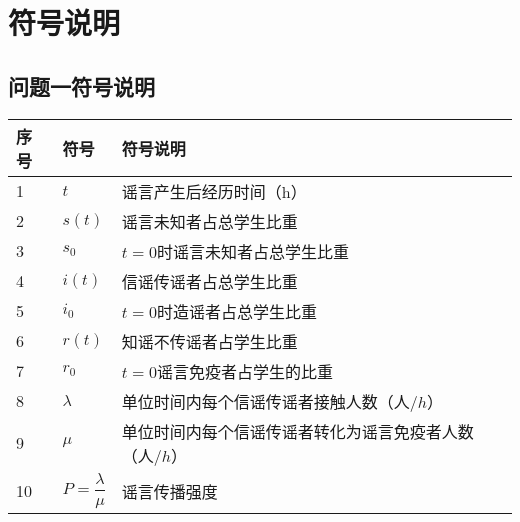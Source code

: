 \documentclass[withoutpreface,bwprint]{cumcmthesis}
\newcommand{\headcol}[1]{\textbf{#1}} %
\begin{document}
\section{符号说明}
\subsection{问题一符号说明}
\begin{table}[htb!]
  \centering
  \small
  \begin{tabular}{p{60pt}<{\centering}|p{60pt}<{\centering}p{180pt}<{\raggedright}}
   \hline
   \headcol 序号 & 符号 & 符号说明 \\
   \hline
    1 & $t$ & 谣言产生后经历时间（h） \\
    2 & $s(t)$ & 谣言未知者占总学生比重\\
    3 & $s_0$ & $t = 0$时谣言未知者占总学生比重 \\
    4 & $i(t)$ &信谣传谣者占总学生比重 \\
    5 & $i_0$ & $t = 0$时造谣者占总学生比重 \\
    6 & $r(t)$& 知谣不传谣者占学生比重\\
    7 & $r_{0}$& $t=0$谣言免疫者占学生的比重\\
    8 & $\lambda$ & 单位时间内每个信谣传谣者接触人数（人/$h$） \\
    9 & $\mu$ & 单位时间内每个信谣传谣者转化为谣言免疫者人数（人/$h$）  \\
    10 & $P=\dfrac{\lambda}{\mu}$& 谣言传播强度\\
    \hline
  \end{tabular}
  \label{symbol}
\end{table}
\end{document}
